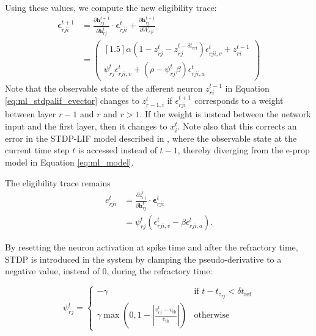 	        Using these values, we compute the new eligibility trace:
	        \begin{align}
	        \mathbf{\epsilon}^{t+1}_{rji} &= \frac{\partial\mathbf{h}^{t+1}_{rj}}{\partial\mathbf{h}^t_{rj}}\cdot\mathbf{\epsilon}^t_{rji} + \frac{\partial\mathbf{h}^{t+1}_{rj}}{\partial W_{rji}}\\
	        &= \begin{pmatrix}[1.5]
	        \alpha\left(1 - z^t_{rj} - z_{rj}^{t-\delta t_\text{ref}}\right)\epsilon_{rji, v}^t + z_{ri}^{t-1}\\
	        \psi^t_{rj}\epsilon^t_{rji, v} + \left(\rho - \psi^t_{rj}\beta\right)\epsilon^t_{rji,a}
	        \end{pmatrix}\label{eq:ml_stdpalif_evector}
	        \end{align}
	        Note that the observable state of the afferent neuron $z_{ri}^{t-1}$ in Equation \ref{eq:ml_stdpalif_evector} changes to $z_{r-1, i}^t$ if $\epsilon^{t+1}_{rji}$ corresponds to a weight between layer $r-1$ and $r$ and $r > 1$.
	        If the weight is instead between the network input and the first layer, then it changes to $x^t_i$.
	        Note also that this corrects an error in the STDP-LIF model described in \cite{traub2020learning}, where the observable state at the current time step $t$ is accessed instead of $t-1$, thereby diverging from the e-prop model in Equation \ref{eq:ml_model}.

	        The eligibility trace remains 
	        \begin{align}
	        e^{t}_{rji} &= \frac{\partial z^{t}_{rj}}{\partial\mathbf{h}^{t}_{rj}} \cdot \mathbf{\epsilon}^{t}_{rji}\\
	        &= \psi^t_{rj}\left(\epsilon^t_{rji, v} - \beta\epsilon^t_{rji, a}\right).
	        \end{align}

	        By resetting the neuron activation at spike time and after the refractory time, STDP is introduced in the system by clamping the pseudo-derivative to a negative value, instead of 0, during the refractory time:

	        \begin{equation}
	        \psi^t_{rj} = \begin{cases}
	        -\gamma&\mbox{if } t - t_{z_{rj}} < \delta t_\text{ref}\\
	        \gamma\max\left(0, 1 - \left|\frac{v^t_{rj}-v_\text{th}}{v_\text{th}}\right|\right)&\mbox{otherwise}
	        \end{cases}
	        \end{equation}


